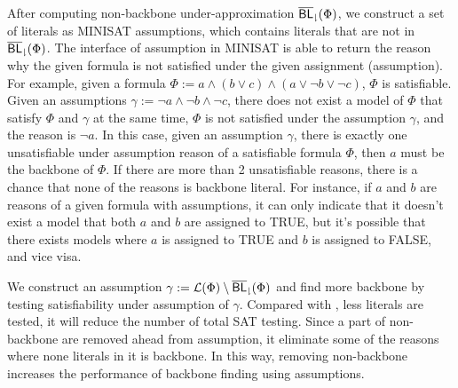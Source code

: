 After computing non-backbone under-approximation ${\sf \overline{BL}_\downharpoonright}(\Phi)$, we construct a set of literals as MINISAT assumptions, which contains literals that are not in ${\sf \overline{BL}_\downharpoonright}(\Phi)$. The interface of assumption in MINISAT is able to return the reason why the given formula is not satisfied under the given assignment (assumption). For example, given a formula $\Phi:=a\wedge(b\vee c)\wedge(a\vee\neg b\vee \neg c)$, $\Phi$ is satisfiable. Given an assumptions $\gamma:=\neg a\wedge\neg b\wedge \neg c$, there does not exist a model of $\Phi$ that satisfy $\Phi$ and $\gamma$ at the same time, $\Phi$ is not satisfied under the assumption $\gamma$, and the reason is $\neg a$. In this case, given an assumption $\gamma$, there is exactly one unsatisfiable under assumption reason of a satisfiable formula $\Phi$, then $a$ must be the backbone of $\Phi$. If there are more than 2 unsatisfiable reasons, there is a chance that none of the reasons is backbone literal. For instance, if $a$ and $b$ are reasons of a given formula with assumptions, it can only indicate that it doesn't exist a model that both $a$ and $b$ are assigned to TRUE, but it's possible that there exists models where $a$ is assigned to TRUE and $b$ is assigned to FALSE, and vice visa. 

We construct an assumption $\gamma:={\cal L}(\Phi)\setminus{\sf \overline{BL}_\downharpoonright}(\Phi)$ and find more backbone by testing satisfiability under assumption of $\gamma$. Compared with \cite{JLM15}, less literals are tested, it will reduce the number of total SAT testing. Since a part of non-backbone are removed ahead from assumption, it eliminate some of the reasons where none literals in it is backbone. In this way, removing non-backbone increases the performance of backbone finding using assumptions.   

 